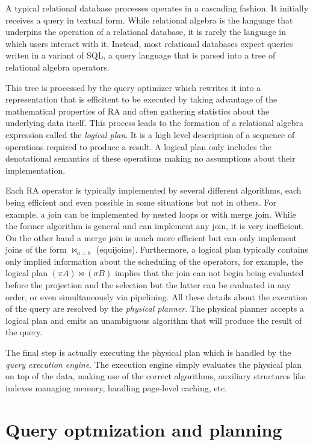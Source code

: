 A typical relational database processes operates in a cascading
fashion. It initially receives a query in textual form. While
relational algebra is the language that underpins the operation of a
relational database, it is rarely the language in which users interact
with it. Instead, most relational databases expect queries writen in a
variant of SQL, a query language that is parsed into a tree of
relational algebra operators.

This tree is processed by the query optimizer which rewrites it into a
representation that is efficitent to be executed by taking advantage
of the mathematical properties of RA and often gathering statistics
about the underlying data itself. This process leads to the formation
of a relational algebra expression called the \emph{logical plan}. It
is a high level description of a sequence of operations required to
produce a result. A logical plan only includes the denotational
semantics of these operations making no assumptions about their
implementation.

Each RA operator is typically implemented by several different
algorithms, each being efficient and even possible in some situations
but not in others. For example, a join can be implemented by nested
loops or with merge join.  While the former algorithm is general and
can implement any join, it is very inefficient. On the other hand a
merge join is much more efficient but can only implement joins of the
form \(\Join_{a=b}\) (equijoins). Furthermore, a logical plan typically
contains only implied information about the scheduling of the
operators, for example, the logical plan \((\pi A) \Join (\sigma B)\)
implies that the join can not begin being evaluated before the
projection and the selection but the latter can be evaluated in any
order, or even simultaneously via pipelining. All these details about
the execution of the query are resolved by the \emph{physical
  planner}. The physical planner accepts a logical plan and emits an
unambiguous algorithm that will produce the result of the query.


The final step is actually executing the physical plan which is
handled by the \emph{query execution engine}. The execution engine
simply evaluates the physical plan on top of the data, making use of
the correct algorithms, auxiliary structures like indexes managing
memory, handling page-level caching, etc.


\section{Query optmization and planning}

